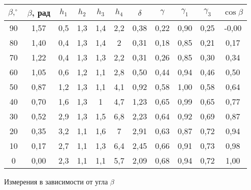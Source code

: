 \begin{tabular}{cc|cccc|cccc|c} \toprule
		$ \beta, ^\circ $ & $ \beta $, рад & $ h_1 $ & $ h_2 $ & $ h_3 $ & $ h_4 $ & $ \delta $ & $ \gamma $ & $ \gamma_1 $ & $ \gamma_3 $ &  $ \cos\beta $  \\ \midrule
		90                                   & 1,57           & 0,5     & 1,3     & 1,4     & 2,2     & 0,38       & 0,22       & 0,90         & 0,25         & -0,00    \\
		80                                   & 1,40           & 0,4     & 1,3     & 1,4     & 2       & 0,31       & 0,18       & 0,85         & 0,21         & 0,17   \\
		70                                   & 1,22           & 0,4     & 1,3     & 1,3     & 2,2     & 0,31       & 0,26       & 0,85         & 0,30         & 0,34   \\
		60                                   & 1,05           & 0,6     & 1,2     & 1,1     & 2,8     & 0,50       & 0,44       & 0,94         & 0,46         & 0,50   \\
		50                                   & 0,87           & 1,2     & 1,3     & 1,1     & 4,1     & 0,92       & 0,58       & 1,00         & 0,58         & 0,64     \\
		40                                   & 0,70           & 1,6     & 1,3     & 1       & 4,7     & 1,23       & 0,65       & 0,99         & 0,65         & 0,77    \\
		30                                   & 0,52           & 2,9     & 1,3     & 1,5     & 6,8     & 2,23       & 0,64       & 0,92         & 0,69         & 0,87   \\
		20                                   & 0,35           & 3,2     & 1,1     & 1,6     & 7       & 2,91       & 0,63       & 0,87         & 0,72         & 0,94    \\
		10                                   & 0,17           & 2,7     & 1,1     & 1,3     & 6,4     & 2,45       & 0,66       & 0,91         & 0,73         & 0,98    \\
		0                                    & 0,00           & 2,3     & 1,1     & 1,1     & 5,7     & 2,09       & 0,68       & 0,94         & 0,72         & 1,00     \\ \bottomrule
	\end{tabular}
	\caption{Измерения в зависимости от угла $ \beta $}
	\label{table1}